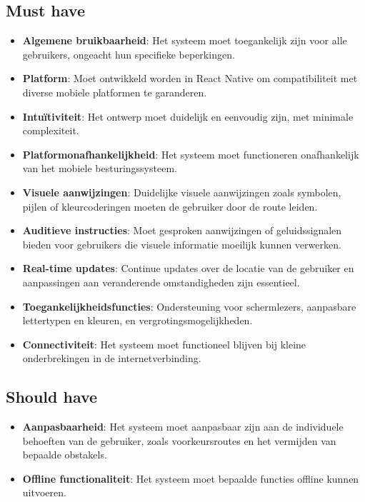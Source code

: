 \subsection*{Must have}
\begin{itemize}[label={--}]
    \item \textbf{Algemene bruikbaarheid}: Het systeem moet toegankelijk zijn voor alle gebruikers, ongeacht hun specifieke beperkingen.
    \item \textbf{Platform}: Moet ontwikkeld worden in React Native om compatibiliteit met diverse mobiele platformen te garanderen.
    \item \textbf{Intuïtiviteit}: Het ontwerp moet duidelijk en eenvoudig zijn, met minimale complexiteit.
    \item \textbf{Platformonafhankelijkheid}: Het systeem moet functioneren onafhankelijk van het mobiele besturingssysteem.
    \item \textbf{Visuele aanwijzingen}: Duidelijke visuele aanwijzingen zoals symbolen, pijlen of kleurcoderingen moeten de gebruiker door de route leiden.
    \item \textbf{Auditieve instructies}: Moet gesproken aanwijzingen of geluidssignalen bieden voor gebruikers die visuele informatie moeilijk kunnen verwerken.
    \item \textbf{Real-time updates}: Continue updates over de locatie van de gebruiker en aanpassingen aan veranderende omstandigheden zijn essentieel.
    \item \textbf{Toegankelijkheidsfuncties}: Ondersteuning voor schermlezers, aanpasbare lettertypen en kleuren, en vergrotingsmogelijkheden.
    \item \textbf{Connectiviteit}: Het systeem moet functioneel blijven bij kleine onderbrekingen in de internetverbinding.
\end{itemize}

\subsection*{Should have}
\begin{itemize}[label={--}]
    \item \textbf{Aanpasbaarheid}: Het systeem moet aanpasbaar zijn aan de individuele behoeften van de gebruiker, zoals voorkeursroutes en het vermijden van bepaalde obstakels.
    \item \textbf{Offline functionaliteit}: Het systeem moet bepaalde functies offline kunnen uitvoeren.
\end{itemize}

